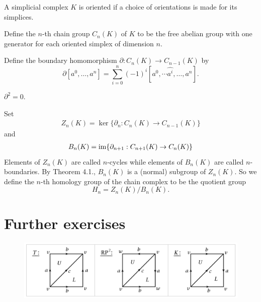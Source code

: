 \documentclass{article}
\begin{document}
\begin{definition}
A simplicial complex $K$ is oriented if a choice of orientations is made for its simplices. 
\end{definition}

\begin{definition}
Define the $n$-th chain group $C_{n}(K)$ of $K$ to be the free abelian group with one generator for each oriented simplex of dimension $n$. 
\end{definition}

\begin{definition}
Define the boundary homomorphism $\partial: C_{n}(K) \rightarrow C_{n - 1}(K)$ by 
\[
\partial[a^{0}, \ldots, a^{n}] = \sum_{i = 0}^{n} (-1)^{i} [a^{0}, \cdots \hat{a^{i}}, \ldots, a^{n}]. 
\]
\end{definition}

\begin{theorem}
$\partial^{2} = 0$. 
\end{theorem}

\begin{definition}
Set 
\begin{align*}
    Z_{n}(K) = \ker\{\partial_{n}: C_{n}(K) \rightarrow C_{n - 1}(K)\} 
\end{align*}
and 
\begin{align*}
    B_{n}(K) = \operatorname{im}\{\partial_{n + 1}: C_{n + 1}(K) \rightarrow C_{n}(K)\} 
\end{align*}
Elements of $Z_{n}(K)$ are called $n$-cycles while elements of $B_{n}(K)$ are called $n$-boundaries. By Theorem 4.1., $B_{n}(K)$ is a (normal) subgroup of $Z_{n}(K)$. So we define the $n$-th homology group of the chain complex to be the quotient group 
\[
H_{n} = Z_{n}(K)/B_{n}(K). 
\]
\end{definition}


\section{Further exercises}

\begin{figure}[hbt!]
\label{fig:aa}
\small
\centering
\includegraphics[scale = 0.5]{Pics/Simplicial.png}
\end{figure}
\leavevmode
\end{document}
